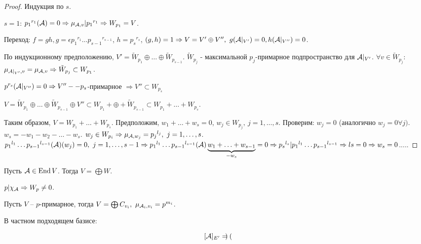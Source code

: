 \documentclass[main]{subfiles}
\begin{document}
\begin{proof}
    Индукция по $s$.

    $s = 1$: ${p_1}^{r_1}(\mathcal{A}) = 0 \Rightarrow \mu_{\mathcal{A}, v} | {p_1}^{r_1} \Rightarrow W_{p_1} = V$.

    Переход: $f = gh, g = \epsilon {p_1}^{r_1} \ldots {p_{s-1}}^{r_{s-1}}$, $h = {p_s}^{r_s}$, $(g, h) = 1 \Rightarrow
        V = V' \oplus V'', \ g(\mathcal{A} |_{V'}) = 0, h(\mathcal{A} |_{V''}) = 0$.

    По индукционному предположению, $V' =  \tilde{W}_{p_1} \oplus \ldots \oplus \tilde{W}_{p_{s-1}}$.
    $\tilde{W}_{p_j}$ - максимальной $p_j$-примарное подпространство для $\mathcal{A} |_{V'}$.
    $\forall v \in \tilde{W}_{p_j}$: $\mu_{\mathcal{A} |_{V'}, v} = \mu_{\mathcal{A}, v} \Rightarrow \tilde{W}_{p_j} \subset W_{p_1}$.

    $p^{r_s}(\mathcal{A} |_{V''}) = 0 \Rightarrow V'' -- p_s$-примарное $ \Rightarrow
        V'' \subset W_{p_s}$

    $V = \tilde{W}_{p_1} \oplus \ldots \oplus \tilde{W}_{p_{s-1}} \oplus V'' \subset W_{p_1} + \oplus + \tilde{W}_{p_{s-1}} \subset W_{p_1} + \ldots + W_{p_s}$.

    Таким образом, $V = W_{p_1} + \ldots + W_{p_s}$. Предположим, $w_1 + \ldots + w_s = 0$, $w_j \in W_{p_j}, \ j = 1, \ldots, s$.
    Проверим: $w_j = 0$ (аналогично $w_j = 0 \forall j)$. $w_s = - w_1 - w_2 - \ldots - w_s$. $w_j \in W_{p_i} \Rightarrow \mu_{\mathcal{A}, w_j} = {p_j}^{l_j}, \ j = 1, \ldots, s$.
    ${p_1}^{l_1} \ldots {p_{s-1}}^{l_{s-1}} (\mathcal{A}) (w_j) = 0, \ j = 1, \ldots, s-1 \Rightarrow
        {p_1}^{l_1} \ldots {p_{s-1}}^{l_{s-1}} (\mathcal{A}) \underbrace{w_1 + \ldots + w_{s-1}}_{-w_s} = 0  \Rightarrow
        {p_s}^{l_s} | {p_1}^{l_1} \ldots {p_{s-1}}^{l_{s-1}} \Rightarrow ls = 0 \Rightarrow w_s = 0$.....
\end{proof}

\begin{corollary}
    Пусть $\mathcal{A} \in \operatorname{End} V$. Тогда $V = \bigoplus W$.
\end{corollary}

\begin{remark}
    $p| \chi_{\mathcal{A}} \Rightarrow W_p \neq 0$.
\end{remark}

\begin{remark}
    Пусть $V$ -- $p$-примарное, тогда $V = \bigoplus C_{v_i}, \ \mu_{\mathcal{A}_i, v_i} = p^{m_i}$.
\end{remark}

В частном подходящем базисе:

\[ [\mathcal{A}]_{E'} = \begin{pmatrix}

    \end{pmatrix}\]
\end{document}
